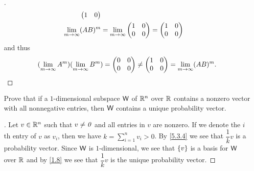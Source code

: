 \begin{proof}[]
\begin{align*}
\begin{pmatrix}
                                                                         1 & 0
                                                                       \end{pmatrix}  \\
    \lim\limits_{m \to \infty} (AB)^m & = \lim\limits_{m \to \infty} \begin{pmatrix}
                                                         1 & 0 \\
                                                         0 & 0
                                                       \end{pmatrix} = \begin{pmatrix}
                                                                         1 & 0 \\
                                                                         0 & 0
                                                                       \end{pmatrix}
  \end{align*}
  and thus
  \[
    (\lim\limits_{m \to \infty} A^m) (\lim\limits_{m \to \infty} B^m) = \begin{pmatrix}
      0 & 0 \\
      0 & 0
    \end{pmatrix} \neq \begin{pmatrix}
      1 & 0 \\
      0 & 0
    \end{pmatrix} = \lim\limits_{m \to \infty} (AB)^m.
  \]
\end{proof}

\setcounter{ex}{14}
\begin{ex}\label{ex:5.3.15}
  Prove that if a \(1\)-dimensional subspace \(\mathsf{W}\) of \(\mathbb{R}^n\) over \(\mathbb{R}\) contains a nonzero vector with all nonnegative entries, then \(\mathsf{W}\) contains a unique probability vector.
\end{ex}

\begin{proof}[]
  Let \(v \in \mathbb{R}^n\) such that \(v \neq \mathit{0}\) and all entries in \(v\) are nonzero.
  If we denote the \(i\)th entry of \(v\) as \(v_i\), then we have \(k = \sum_{i = 1}^n v_i > 0\).
  By \cref{5.3.4} we see that \(\dfrac{1}{k} v\) is a probability vector.
  Since \(\mathsf{W}\) is \(1\)-dimensional, we see that \(\left\lbrace v\right\rbrace\) is a basis for \(\mathsf{W}\) over \(\mathbb{R}\) and by \cref{1.8} we see that \(\dfrac{1}{k} v\) is the unique probability vector.
\end{proof}

